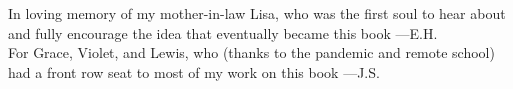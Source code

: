 
\thispagestyle{empty}

\begin{center}
In loving memory of my mother-in-law Lisa, 
who was the first soul to hear about and fully encourage the idea that eventually became this book
---E.H.
\\[2in]

For Grace, Violet, and Lewis, 
who (thanks to the pandemic and remote school) had a front row seat to most of my work on this book
---J.S.

\end{center}

\setlength{\abovedisplayskip}{-5pt}
\setlength{\abovedisplayshortskip}{-5pt}